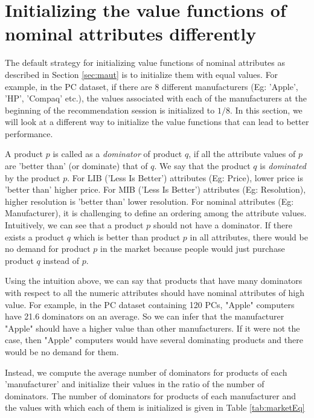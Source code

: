 \section{Initializing the value functions of nominal attributes differently}
The default strategy for initializing value functions of nominal attributes as described in Section \ref{sec:maut} is to initialize them with equal values. 
For example, in the PC dataset, if there are 8 different manufacturers (Eg: 'Apple', 'HP', 'Compaq' etc.), the values associated with each of the manufacturers at the beginning of the recommendation session is initialized to $1/8$.
In this section, we will look at a different way to initialize the value functions that can lead to better performance.

A product $p$ is called as a \textit{dominator} of product $q$, if all the attribute values of  $p$ are 'better than' (or dominate) that of $q$. 
We say that the product $q$ is \textit{dominated} by the product $p$.
For LIB ('Less Is Better') attributes (Eg: Price), lower price is 'better than' higher price.
For MIB ('Less Is Better') attributes (Eg: Resolution), higher resolution is 'better than' lower resolution.
For nominal attributes (Eg: Manufacturer), it is challenging to define an ordering among the attribute values.
Intuitively, we can see that a product $p$ should not have a dominator. 
If there exists a product $q$ which is better than product $p$ in all attributes, there would be no demand for product $p$ in the market because people would just purchase product $q$ instead of $p$.

Using the intuition above, we can say that products that have many dominators with respect to all the numeric attributes should have nominal attributes of high value.
For example, in the PC dataset containing 120 PCs, "Apple" computers have 21.6 dominators on an average. 
So we can infer that the manufacturer "Apple" should have a higher value than other manufacturers. 
If it were not the case, then "Apple" computers would have several dominating products and there would be no demand for them.

Instead, we compute the average number of dominators for products of each 'manufacturer' and initialize their values in the ratio of the number of dominators.
The number of dominators for products of each manufacturer and the values with which each of them is initialized is given in Table \ref{tab:marketEq}


